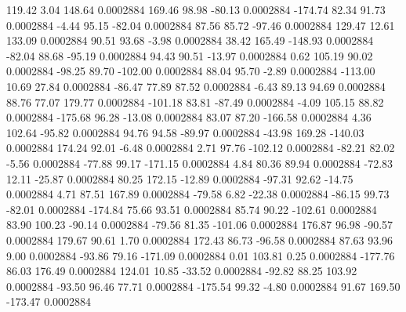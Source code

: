       119.42        3.04      148.64     0.0002884
      169.46       98.98      -80.13     0.0002884
     -174.74       82.34       91.73     0.0002884
       -4.44       95.15      -82.04     0.0002884
       87.56       85.72      -97.46     0.0002884
      129.47       12.61      133.09     0.0002884
       90.51       93.68       -3.98     0.0002884
       38.42      165.49     -148.93     0.0002884
      -82.04       88.68      -95.19     0.0002884
       94.43       90.51      -13.97     0.0002884
        0.62      105.19       90.02     0.0002884
      -98.25       89.70     -102.00     0.0002884
       88.04       95.70       -2.89     0.0002884
     -113.00       10.69       27.84     0.0002884
      -86.47       77.89       87.52     0.0002884
       -6.43       89.13       94.69     0.0002884
       88.76       77.07      179.77     0.0002884
     -101.18       83.81      -87.49     0.0002884
       -4.09      105.15       88.82     0.0002884
     -175.68       96.28      -13.08     0.0002884
       83.07       87.20     -166.58     0.0002884
        4.36      102.64      -95.82     0.0002884
       94.76       94.58      -89.97     0.0002884
      -43.98      169.28     -140.03     0.0002884
      174.24       92.01       -6.48     0.0002884
        2.71       97.76     -102.12     0.0002884
      -82.21       82.02       -5.56     0.0002884
      -77.88       99.17     -171.15     0.0002884
        4.84       80.36       89.94     0.0002884
      -72.83       12.11      -25.87     0.0002884
       80.25      172.15      -12.89     0.0002884
      -97.31       92.62      -14.75     0.0002884
        4.71       87.51      167.89     0.0002884
      -79.58        6.82      -22.38     0.0002884
      -86.15       99.73      -82.01     0.0002884
     -174.84       75.66       93.51     0.0002884
       85.74       90.22     -102.61     0.0002884
       83.90      100.23      -90.14     0.0002884
      -79.56       81.35     -101.06     0.0002884
      176.87       96.98      -90.57     0.0002884
      179.67       90.61        1.70     0.0002884
      172.43       86.73      -96.58     0.0002884
       87.63       93.96        9.00     0.0002884
      -93.86       79.16     -171.09     0.0002884
        0.01      103.81        0.25     0.0002884
     -177.76       86.03      176.49     0.0002884
      124.01       10.85      -33.52     0.0002884
      -92.82       88.25      103.92     0.0002884
      -93.50       96.46       77.71     0.0002884
     -175.54       99.32       -4.80     0.0002884
       91.67      169.50     -173.47     0.0002884
